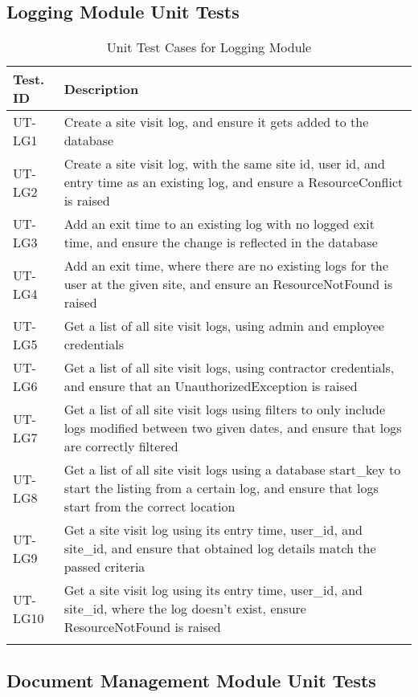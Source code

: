 \documentclass[12pt, titlepage]{article}
\begin{document}
\subsection{Logging Module Unit Tests}

\begin{longtable}{|m{2cm}|m{10cm}|}
  \hline
  \textbf{Test. ID} & \textbf{Description} \\ \hline
  UT-LG1 & Create a site visit log, and ensure it gets added to the
  database\\ \hline
  UT-LG2 & Create a site visit log, with the same site id, user id,
  and entry time as an existing log, and ensure a ResourceConflict is
  raised\\ \hline
  UT-LG3 & Add an exit time to an existing log with no logged exit
  time, and ensure the change is reflected in the database\\ \hline
  UT-LG4 & Add an exit time, where there are no existing logs for
  the user at the given site, and ensure an ResourceNotFound is
  raised\\ \hline
  UT-LG5 & Get a list of all site visit logs, using admin and
  employee credentials\\ \hline
  UT-LG6 & Get a list of all site visit logs, using contractor
  credentials, and ensure that an UnauthorizedException is raised\\ \hline
  UT-LG7 & Get a list of all site visit logs using filters to only
  include logs modified between two given dates, and ensure that logs
  are correctly filtered\\ \hline
  UT-LG8 & Get a list of all site visit logs using a database
  start\_key to start the listing from a certain log, and ensure that
  logs start from the correct location\\ \hline
  UT-LG9 & Get a site visit log using its entry time, user\_id, and
  site\_id, and ensure that obtained log details match the passed
  criteria\\ \hline
  UT-LG10 & Get a site visit log using its entry time, user\_id, and
  site\_id, where the log doesn't exist, ensure ResourceNotFound is
  raised\\ \hline
  \caption{Unit Test Cases for Logging Module}
\end{longtable}

\subsection{Document Management Module Unit Tests}
\end{document}
